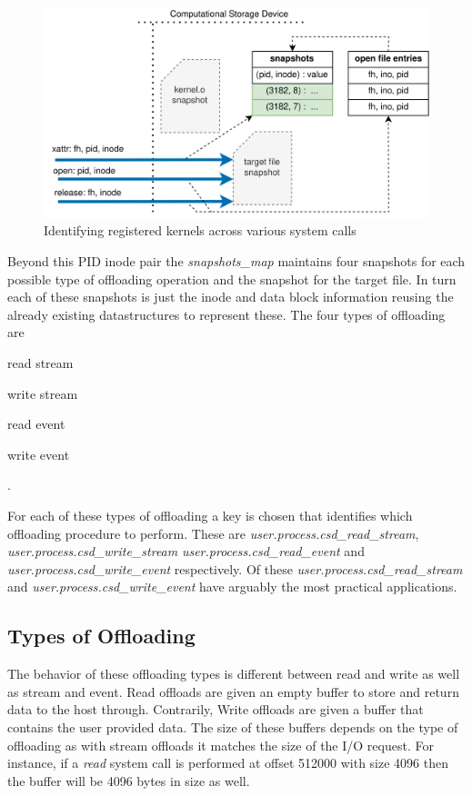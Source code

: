 \begin{figure}
    \centering
	\includegraphics[width=1\textwidth]{resources/images/offloading-management.png}
	\caption{Identifying registered kernels across various system calls}
    \label{figure:offloadingmanagement}
\end{figure}

Beyond this PID inode pair the \textit{snapshots\_map} maintains four snapshots
for each possible type of offloading operation and the snapshot for the target
file. In turn each of these snapshots is just the inode and data block
information reusing the already existing datastructures to represent these.
The four types of offloading are \begin{enumerate*} \item read stream
\item write stream \item read event \item write event \end{enumerate*}.

For each of these types of offloading a key is chosen that identifies which
offloading procedure to perform. These are
\textit{user.process.csd\_read\_stream},
\textit{user.process.csd\_write\_stream} \textit{user.process.csd\_read\_event}
and \textit{user.process.csd\_write\_event} respectively. Of these
\textit{user.process.csd\_read\_stream} and
\textit{user.process.csd\_write\_event} have arguably the most practical 
applications.

\subsection{Types of Offloading}

The behavior of these offloading types is different between read and write as
well as stream and event. Read offloads are given an empty buffer to store and
return data to the host through. Contrarily, Write offloads are given a buffer
that contains the user provided data. The size of these buffers depends on the
type of offloading as with stream offloads it matches the size of the I/O
request. For instance, if a \textit{read} system call is performed at offset
512000 with size 4096 then the buffer will be 4096 bytes in size as well.

